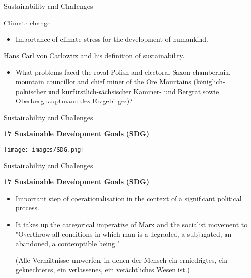 \documentclass{beamer}
\title{Modelling Sustainable Systems\\ and Semantic Web\\[6pt]
  Systems and Sustainability
  \vskip1em}
\subtitle{Lecture in the Module 10-202-2312\\ for Master Computer Science}
\author{Prof. Dr. Hans-Gert Gräbe\\
\url{http://www.informatik.uni-leipzig.de/~graebe}}
\date{May 2022}
\begin{document}
{
\begin{frame}
  \titlepage
\end{frame}}

\begin{frame}{Sustainability and Challenges}

Climate change
\begin{itemize}
\item Importance of climate stress for the development of humankind.
\end{itemize}

Hans Carl von Carlowitz and his definition of sustainability.
\begin{itemize}
\item What problems faced the royal Polish and electoral Saxon chamberlain,
  mountain councillor and chief miner of the Ore Mountains
  (königlich-polnischer und kurfürstlich-sächsischer Kammer- und Bergrat sowie
  Oberberghauptmann des Erzgebirges)?
\end{itemize}
\end{frame}

\begin{frame}{Sustainability and Challenges}

  \begin{center}\large\bf
    17 Sustainable Development Goals (SDG)
  \end{center}
  \begin{center}
    \texttt{[image: images/SDG.png]}
  \end{center}
\end{frame}

\begin{frame}{Sustainability and Challenges}

  \begin{center}\large\bf
    17 Sustainable Development Goals (SDG)
  \end{center}
  
\begin{itemize}
\item Important step of operationalisation in the context of a significant
  political process.
\item It takes up the categorical imperative of Marx and the socialist
  movement to "Overthrow all conditions in which man is a degraded, a
  subjugated, an abandoned, a contemptible being."\medskip

  (Alle Verhältnisse umwerfen, in denen der Mensch ein erniedrigtes, ein
  geknechtetes, ein verlassenes, ein verächtliches Wesen ist.)
\end{itemize}
\end{frame}
\end{document}
